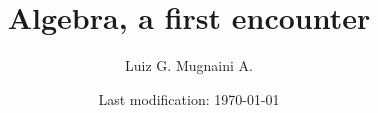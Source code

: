 \documentclass[11pt, reqno, openany, draft]{memoir}
\title{Algebra, a first encounter}
\author{Luiz G. Mugnaini A.}
\date{Last modification: \today}
\theoremstyle{definition}
\begin{document}
\maketitle
\tableofcontents
\listoftodos
\end{document}
